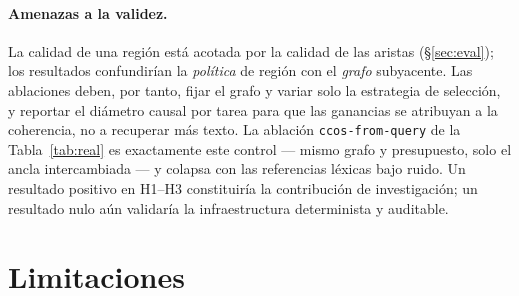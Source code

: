 \documentclass[11pt]{article}
\newcommand{\code}[1]{\texttt{#1}}
\begin{document}
\paragraph{Amenazas a la validez.} La calidad de una región está acotada por la calidad
de las aristas (\S\ref{sec:eval}); los resultados confundirían la \emph{política} de
región con el \emph{grafo} subyacente. Las ablaciones deben, por tanto, fijar el grafo y
variar solo la estrategia de selección, y reportar el diámetro causal por tarea para que
las ganancias se atribuyan a la coherencia, no a recuperar más texto. La ablación
\code{ccos-from-query} de la Tabla~\ref{tab:real} es exactamente este control --- mismo
grafo y presupuesto, solo el ancla intercambiada --- y colapsa con las referencias
léxicas bajo ruido. Un resultado positivo en H1--H3 constituiría la contribución de
investigación; un resultado nulo aún validaría la infraestructura determinista y
auditable.

\section{Limitaciones}
\end{document}
